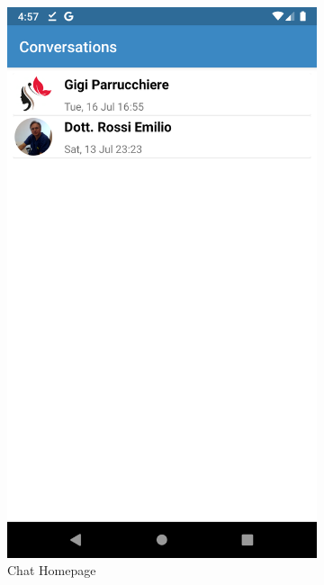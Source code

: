 \begin{figure}[h]
\centering
\begin{subfigure}{.5\textwidth}
  \centering
  \includegraphics[height=.4\textheight, keepaspectratio=true]{Img/Screens/Chat_Home}
  \caption{Chat Homepage}
\end{subfigure}%
\begin{subfigure}{.5\textwidth}
  \centering

\end{subfigure}
\end{figure}
